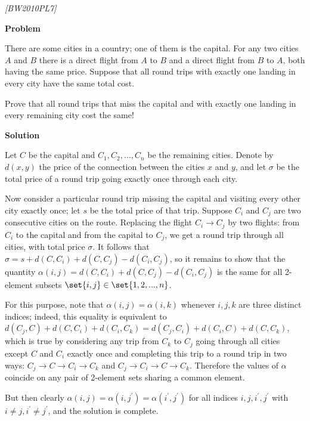 \filbreak

\begin{problem}
\textit{[BW2010PL7]}



\textbf{Problem}


There are some cities in a country; one of them is the capital. For any two cities $A$ and $B$ there is a direct flight from $A$ to $B$ and a direct flight from $B$ to $A$, both having the
same price. Suppose that all round trips with exactly one landing in every city have the same total cost. 

Prove that all round trips that miss the capital and with exactly one landing in every remaining city cost the same!



\textbf{Solution}


Let $C$ be the capital and $C_1, C_2, \dots, C_n$ be the remaining cities. Denote by $d(x, y)$
the price of the connection between the cities $x$ and $y$, and let $\sigma$ be the total price of a round
trip going exactly once through each city.


Now consider a particular round trip missing the capital and visiting every other city exactly once; let $s$ be the total price of that trip. Suppose $C_i$ and $C_j$ are two consecutive cities on the route.
Replacing the flight $C_i \rightarrow C_j$ by two flights: from $C_i$ to the capital and from the capital to $C_j$, we
get a round trip through all cities, with total price $\sigma$. It follows that $\sigma = s+d(C, C_i)+d(C, C_j )−d(C_i, C_j )$, so it remains to show that the quantity $\alpha(i,j) = d(C, C_i) + d(C, C_j )−d(C_i, C_j )$ is the same for all 2-element subsets $\set{i, j} \in \set{1, 2, . . . , n}$.



For this purpose, note that $\alpha(i, j) = \alpha(i, k)$ whenever $i, j, k$ are three distinct indices; indeed,
this equality is equivalent to $d(C_j , C) + d(C, C_i) + d(C_i, C_k) = d(C_j , C_i) + d(C_i, C) + d(C, C_k)$, which is true by considering any trip from $C_k$ to $C_j$ going through all cities except $C$ and $C_i$ exactly once and completing this trip to a round trip in two ways: $C_j \rightarrow C \rightarrow C_i \rightarrow C_k$ and $C_j \rightarrow C_i \rightarrow C \rightarrow C_k$. Therefore the values of $\alpha$ coincide on any pair of 2-element sets sharing a common element. 

But then clearly $\alpha(i, j) = \alpha(i, j^\prime)= \alpha(i^\prime, j^\prime)$ for all indices $i, j, i^\prime, j^\prime$ with $i\ne j, i^\prime \ne j^\prime $, and the solution is complete.

\end{problem}
